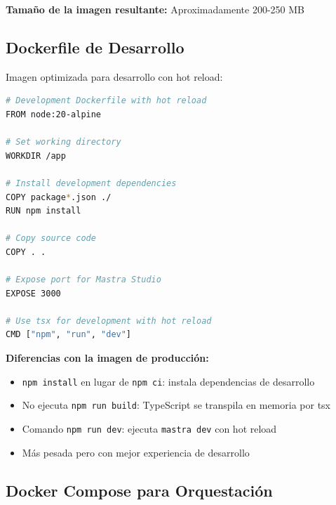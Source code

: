 \documentclass[12pt,a4paper]{article}
\begin{document}
\textbf{Tamaño de la imagen resultante:} Aproximadamente 200-250 MB

\subsection{Dockerfile de Desarrollo}

Imagen optimizada para desarrollo con hot reload:

\begin{lstlisting}[language=bash, caption=Dockerfile.dev - Imagen de Desarrollo]
# Development Dockerfile with hot reload
FROM node:20-alpine

# Set working directory
WORKDIR /app

# Install development dependencies
COPY package*.json ./
RUN npm install

# Copy source code
COPY . .

# Expose port for Mastra Studio
EXPOSE 3000

# Use tsx for development with hot reload
CMD ["npm", "run", "dev"]
\end{lstlisting}

\textbf{Diferencias con la imagen de producción:}

\begin{itemize}
    \item \texttt{npm install} en lugar de \texttt{npm ci}: instala dependencias de desarrollo
    \item No ejecuta \texttt{npm run build}: TypeScript se transpila en memoria por tsx
    \item Comando \texttt{npm run dev}: ejecuta \texttt{mastra dev} con hot reload
    \item Más pesada pero con mejor experiencia de desarrollo
\end{itemize}

\subsection{Docker Compose para Orquestación}
\end{document}
